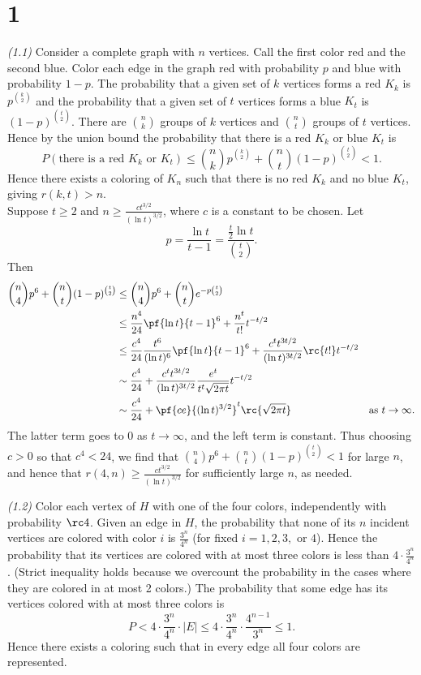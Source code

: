 \section{1}

\begin{problem}{\it(1.1)}
Consider a complete graph with $n$ vertices. Call the first color red and the second blue. Color each edge in the graph red with probability $p$ and blue with probability $1-p$. The probability that a given set of $k$ vertices forms a red $K_k$ is $p^{\binom k2}$ and the probability that a given set of $t$ vertices forms a blue $K_t$ is $(1-p)^{\binom t2}$. There are $\binom nk$ groups of $k$ vertices and $\binom nt$ groups of $t$ vertices. Hence by the union bound the probability that there is a red $K_k$ or blue $K_t$ is
\[
P(\text{there is a red }K_k\text{ or }K_t)\leq \binom nk p^{\binom k2}+\binom nt(1-p)^{\binom t2}<1.
\]
Hence there exists a coloring of $K_n$ such that there is no red $K_k$ and no blue $K_t$, giving $r(k,t)>n$.\\

Suppose $t\geq 2$ and $n\geq \frac{ct^{3/2}}{(\ln t)^{3/2}}$, where $c$ is a constant to be chosen. Let
\[
p=\frac{\ln t}{t-1}=\frac{\frac t2\ln t}{\binom t2}.
\]
Then
\begin{align*}
\binom n4 p^{6}+\binom nt (1-p)^{\binom t2}
&\leq \binom n4 p^6 +\binom nt e^{-p\binom t2}\\
&\leq \frac{n^4}{24} \pf{\ln t}{t-1}^6+\frac{n^t}{t!}t^{-t/2}\\
&\leq \frac{c^4}{24}\frac{t^6}{(\ln t)^6} \pf{\ln t}{t-1}^6 + \frac{c^{t}t^{3t/2}}{(\ln t)^{3t/2}}\rc{t!}t^{-t/2}\\
&\sim \frac{c^4}{24}+\frac{c^{t}t^{3t/2}}{(\ln t)^{3t/2}} \frac{e^t}{t^t\sqrt{2\pi t}} t^{-t/2}\\
&\sim \frac{c^4}{24}+\pf{ce}{(\ln t)^{3/2}}^t\rc{\sqrt{2\pi t}}&\text{as }t\to \infty.
\end{align*}
The latter term goes to 0 as $t\to \infty$, and the left term is constant. Thus choosing $c>0$ so that $c^4<24$, we find that $\binom n4 p^{6}+\binom nt (1-p)^{\binom t2}<1$ for large $n$, and hence that $r(4,n)\geq \frac{ct^{3/2}}{(\ln t)^{3/2}}$ for sufficiently large $n$, as needed. %

\end{problem}
\begin{problem}{\it (1.2)}
Color each vertex of $H$ with one of the four colors, independently with probability $\rc 4$. Given an edge in $H$, the probability that none of its $n$ incident vertices are colored with color $i$ is $\frac{3^n}{4^n}$ (for fixed $i=1,2,3,$ or $4$). Hence the probability that its vertices are colored with at most three colors is less than $4\cdot \frac {3^n}{4^n}$. (Strict inequality holds because we overcount the probability in the cases where they are colored in at most 2 colors.) The probability that some edge has its vertices colored with at most three colors is
\[
P< 4\cdot \frac {3^n}{4^n}\cdot |E|\leq 4\cdot \frac{3^n}{4^n}\cdot \frac{4^{n-1}}{3^n}\leq 1.
\]
Hence there exists a coloring such that in every edge all four colors are represented.
\end{problem}
